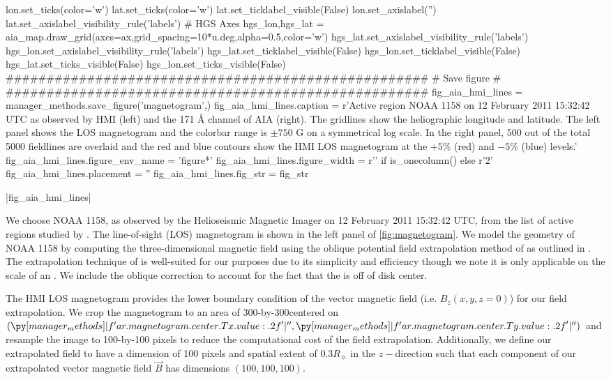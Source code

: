 \begin{pycode}
lon.set_ticks(color='w')
lat.set_ticks(color='w')
lat.set_ticklabel_visible(False)
lon.set_axislabel('')
lat.set_axislabel_visibility_rule('labels')
# HGS Axes
hgs_lon,hgs_lat = aia_map.draw_grid(axes=ax,grid_spacing=10*u.deg,alpha=0.5,color='w')
hgs_lat.set_axislabel_visibility_rule('labels')
hgs_lon.set_axislabel_visibility_rule('labels')
hgs_lat.set_ticklabel_visible(False)
hgs_lon.set_ticklabel_visible(False)
hgs_lat.set_ticks_visible(False)
hgs_lon.set_ticks_visible(False)
####################################################
#                  Save figure                     #
####################################################
fig_aia_hmi_lines = manager_methods.save_figure('magnetogram',)
fig_aia_hmi_lines.caption = r'Active region NOAA 1158 on 12 February 2011 15:32:42 UTC as observed by HMI (left) and the 171 \AA{} channel of AIA (right). The gridlines show the heliographic longitude and latitude. The left panel shows the LOS magnetogram and the colorbar range is $\pm750$ G on a symmetrical log scale. In the right panel, 500 out of the total 5000 fieldlines are overlaid and the red and blue contours show the HMI LOS magnetogram at the $+5\%$ (red) and $-5\%$ (blue) levels.'
fig_aia_hmi_lines.figure_env_name = 'figure*'
fig_aia_hmi_lines.figure_width = r'\columnwidth' if is_onecolumn() else r'2\columnwidth'
fig_aia_hmi_lines.placement = ''
fig_aia_hmi_lines.fig_str = fig_str
\end{pycode}
|fig_aia_hmi_lines|

We choose \AR{} NOAA 1158, as observed by the Helioseismic Magnetic Imager \citep[HMI,][]{hoeksema_helioseismic_2014} on 12 February 2011 15:32:42 UTC, from the list of active regions studied by \citet{warren_systematic_2012}. The line-of-sight (LOS) magnetogram is shown in the left panel of \autoref{fig:magnetogram}. We model the geometry of \AR{} NOAA 1158 by computing the three-dimensional magnetic field using the oblique potential field extrapolation method of \citet{schmidt_observable_1964} as outlined in \citet[section 3]{sakurai_greens_1982}. The extrapolation technique of \citeauthor{schmidt_observable_1964} is well-suited for our purposes due to its simplicity and efficiency though we note it is only applicable on the scale of an \AR{}. We include the oblique correction to account for the fact that the \AR{} is off of disk center. 

The HMI LOS magnetogram provides the lower boundary condition of the vector magnetic field (i.e. $B_z(x,y,z=0)$) for our field extrapolation. We crop the magnetogram to an area of 300\arcsec-by-300\arcsec centered on $(\py[manager_methods]|f'{ar.magnetogram.center.Tx.value:.2f}'|\arcsec,\py[manager_methods]|f'{ar.magnetogram.center.Ty.value:.2f}'|\arcsec)$ and resample the image to 100-by-100 pixels to reduce the computational cost of the field extrapolation. Additionally, we define our extrapolated field to have a dimension of 100 pixels and spatial extent of $0.3R_{\sun}$ in the $z-$direction such that each component of our extrapolated vector magnetic field $\vec{B}$ has dimensions $(100,100,100)$.

